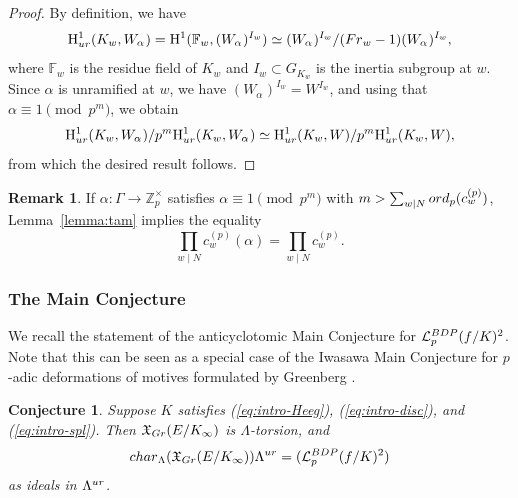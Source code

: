 \documentclass[10pt,reqno]{amsart}
\numberwithin{equation}{section}
\theoremstyle{plain}
\theoremstyle{definition}
\newtheorem{rmk}[thm]{Remark}
\theoremstyle{definition}
\theoremstyle{plain}
\theoremstyle{plain}
\theoremstyle{plain}
\theoremstyle{plain}
\newtheorem{conj}[thm]{Conjecture}
\theoremstyle{plain}
\theoremstyle{plain}
\newcommand{\al}{\alpha} %
\newcommand{\Z}{\mathbb{Z}}
\newcommand{\X}{\mathfrak{X}}
\DeclareMathOperator{\frob}{Frob}
\newcommand{\Lcal}{\mathcal{L}}
\newcommand{\rH}{\mathrm{H}}
\begin{document}
\begin{proof}
By definition, we have 
\[
\rH^1_{\rm ur}(K_w,W_{\al^{}})=\rH^1(\mathbb{F}_w,(W_{\al^{}})^{I_w})\simeq(W_{\al^{}})^{I_w}/({\rm Fr}_w-1)(W_{\al^{}})^{I_w},
\] 
where $\mathbb{F}_w$ is the residue field of $K_w$ and $I_w\subset G_{K_w}$ is the inertia subgroup at $w$. Since $\al$ is unramified at $w$, we have $(W_{\al^{}})^{I_w}=W^{I_w}$, 
and using that $\al \equiv 1 \pmod{p^m}$, we obtain 
\[
\rH^1_{\rm ur}(K_w,W_{\al^{}})/p^m\rH^1_{\rm ur}(K_w,W_{\al^{}})\simeq \rH^1_{\rm ur}(K_w,W)/p^m \rH^1_{\rm ur}(K_w,W),
\]
from which the desired result follows.
\end{proof}

\begin{rmk}\label{rmktam} 
If $\al:\Gamma\rightarrow\Z_p^\times$ satisfies $\al\equiv 1 \pmod{p^m}$ with $m> \sum_{w\mid N}{\rm ord}_p(c^{(p)}_w)$, Lemma~\ref{lemma:tam} implies the equality 
\[
\prod_{w\mid N}c_w^{(p)}(\al) = \prod_{w\mid N} c^{(p)}_w.
\]
\end{rmk}

\subsubsection{The Main Conjecture}\label{subsec:anticycmc}
We recall the statement of the anticyclotomic Main Conjecture for $\mathcal{L}_p^{\rm BDP}(f/K)^2$. Note that this can be seen as a special case of the Iwasawa Main Conjecture for $p$-adic deformations of motives formulated by Greenberg \cite{greenberg-motives}.

\begin{conj}%
\label{conj:anticyc}
Suppose $K$ satisfies {\rm (\ref{eq:intro-Heeg})}, {\rm (\ref{eq:intro-disc})}, and {\rm (\ref{eq:intro-spl})}.
Then $\X_{\rm Gr}(E/K_\infty)$ is $\Lambda$-torsion, and
\[
{\rm char}_\Lambda(\X_{\rm Gr}(E/K_\infty))\Lambda^{\rm ur}=(\Lcal_p^{\rm BDP}(f/K)^2)
\]
as ideals in $\Lambda^{\rm ur}$.
\end{conj}

\end{document}
